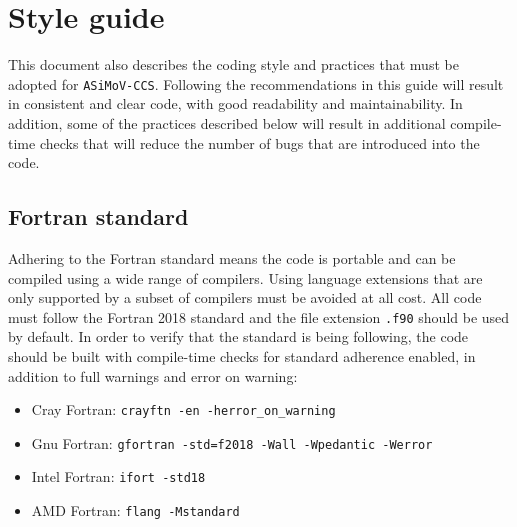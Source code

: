 \documentclass[11pt]{report}
\newcommand{\accs}{\texttt{ASiMoV-CCS}}
\begin{document}
\chapter{Style guide}
This document also describes the coding style and practices that must be adopted for \accs . Following the recommendations in this guide will result in consistent and clear code, with good readability and maintainability. In addition,  some of the practices described below will result in additional compile-time checks that will reduce the number of bugs that are introduced into the code.

\section{Fortran standard}
Adhering to the Fortran standard means the code is portable and can be compiled using a wide range of compilers. 
Using language extensions that are only supported by a subset of compilers must be avoided at all cost. All code 
must follow the Fortran 2018 standard and the file extension \texttt{.f90} should be used by default. In order to 
verify that the standard is being following, the code should be built with compile-time checks for standard 
adherence enabled, in addition to full warnings and error on warning:
\begin{itemize}
\item Cray Fortran: \texttt{crayftn -en -herror\_on\_warning}
\item Gnu Fortran: \texttt{gfortran -std=f2018 -Wall -Wpedantic -Werror}
\item Intel Fortran: \texttt{ifort -std18}
\item AMD Fortran: \texttt{flang -Mstandard}
\end{itemize}
\end{document}
